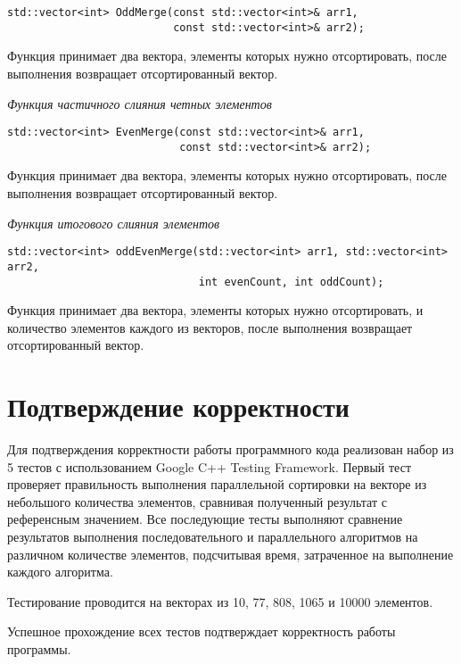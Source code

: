\documentclass{report}
\begin{document}
\begin{lstlisting}
std::vector<int> OddMerge(const std::vector<int>& arr1, 
                          const std::vector<int>& arr2);
\end{lstlisting}
Функция принимает два вектора, элементы которых нужно отсортировать, после выполнения возвращает отсортированный вектор.
\par \textit{Функция частичного слияния четных элементов}
\begin{lstlisting}
std::vector<int> EvenMerge(const std::vector<int>& arr1, 
                           const std::vector<int>& arr2);
\end{lstlisting}
Функция принимает два вектора, элементы которых нужно отсортировать, после выполнения возвращает отсортированный вектор.
\par \textit{Функция итогового слияния элементов}
\begin{lstlisting}
std::vector<int> oddEvenMerge(std::vector<int> arr1, std::vector<int> arr2, 
                              int evenCount, int oddCount);
\end{lstlisting}
Функция принимает два вектора, элементы которых нужно отсортировать, и количество элементов каждого из векторов, после выполнения возвращает отсортированный вектор.
\newpage

\section*{Подтверждение корректности}
\par Для подтверждения корректности работы программного кода реализован набор из 5 тестов с использованием Google C++ Testing Framework. Первый тест проверяет правильность выполнения параллельной сортировки на векторе из небольшого количества элементов, сравнивая полученный результат с референсным значением. Все последующие тесты выполняют сравнение результатов выполнения последовательного и параллельного алгоритмов на различном количестве элементов, подсчитывая время, затраченное на выполнение каждого алгоритма.
\par Тестирование проводится на векторах из 10, 77, 808, 1065 и 10000 элементов.
\par Успешное прохождение всех тестов подтверждает корректность работы программы.
\newpage

\end{document}
